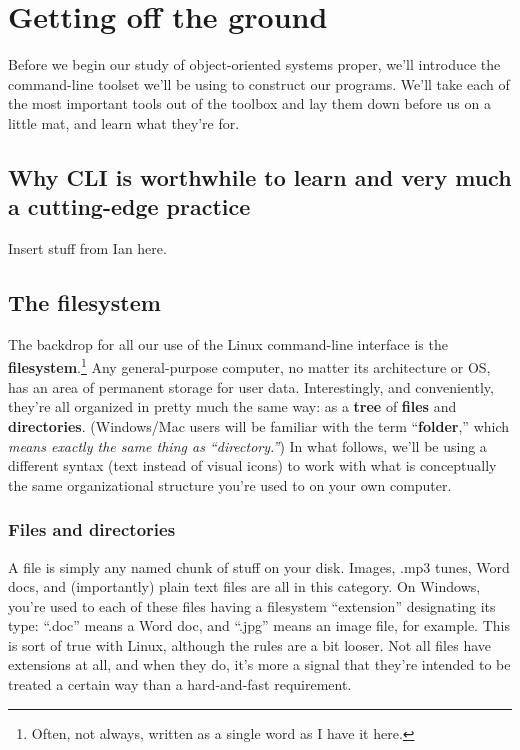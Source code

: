 
\chapter{Getting off the ground}
\label{ch:gettingOff}

Before we begin our study of object-oriented systems proper, we'll introduce
the command-line toolset we'll be using to construct our programs. We'll take
each of the most important tools out of the toolbox and lay them down before
us on a little mat, and learn what they're for.

\section{Why CLI is worthwhile to learn and very much a cutting-edge practice}

Insert stuff from Ian here.

\section{The filesystem}

The backdrop for all our use of the Linux command-line interface is the
\textbf{filesystem}.\footnote{Often, not always, written as a single word as I
have it here.} Any general-purpose computer, no matter its architecture or OS,
has an area of permanent storage for user data. Interestingly, and
conveniently, they're all organized in pretty much the same way: as a
\textbf{tree} of \textbf{files} and \textbf{directories}. (Windows/Mac users
will be familiar with the term ``\textbf{folder},'' which \textit{means exactly
the same thing as ``directory.''}) In what follows, we'll be using a different
syntax (text instead of visual icons) to work with what is conceptually the
same organizational structure you're used to on your own computer.

\subsection{Files and directories}

A file is simply any named chunk of stuff on your disk. Images, .mp3 tunes,
Word docs, and (importantly) plain text files are all in this category. On
Windows, you're used to each of these files having a filesystem ``extension''
designating its type: ``.doc'' means a Word doc, and ``.jpg'' means an image
file, for example. This is sort of true with Linux, although the rules are
a bit looser. Not all files have extensions at all, and when they do, it's
more a signal that they're intended to be treated a certain way than a
hard-and-fast requirement.

